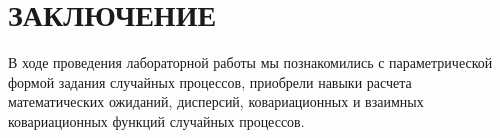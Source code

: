 \section*{ЗАКЛЮЧЕНИЕ}

В ходе проведения лабораторной работы мы познакомились с параметрической формой
задания случайных процессов, приобрели навыки расчета математических ожиданий,
дисперсий, ковариационных и взаимных ковариационных функций случайных процессов.

\newpage

